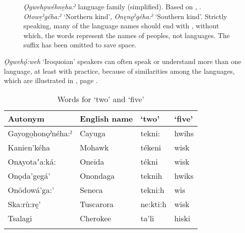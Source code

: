 \begin{figure}
\small{}
\caption{\textit{Ǫgwehǫwéhne̱ha:ˀ} language family (simplified). Based on \citet{schillaci_linguistic_2017}, \citet{eberhard_ethnologue_2022}. \textit{Otowe̱ˀgéha:ˀ} ‘Northern kind’, \textit{Onęnǫ̱ˀgéha:ˀ} ‘Southern kind’. Strictly speaking, many of the language names should end with , without which, the words represent the names of peoples, not languages. The suffix has been omitted to save space.}
\label{map:Iroq.language.family}
\end{figure}

\textit{Ǫgwehǫ́:weh} ‘Iroquoian’ speakers can often speak or understand more than one language, at least with practice, because of similarities among the languages, which are illustrated in , page \pageref{figtab:1:twofive}.

\begin{table}
\caption{Words for ‘two’ and ‘five’\label{figtab:1:twofive}}
\begin{tabular}{llll} 
\lsptoprule
Autonym & English name & `two' & `five'\\
\midrule
Gayogo̱honǫ\-ˀnéha:ˀ & Cayuga & tekni: & hwihs\\
Kanien’kéha & Mohawk & tékeni & wisk\\
Onʌyotaʼa:ká: & Oneida & tékni & wisk\\
Onǫda’gegá’ & Onondaga & teknih & hwiks\\
Onödowá’ga:’ & Seneca & tekni:h & wis\\
Ska:rù:rę’ & Tuscarora & ne:kti:h & wisk\\
Tsalagi & Cherokee & ta’li & hiski\\
\lspbottomrule
\end{tabular}
\end{table}

